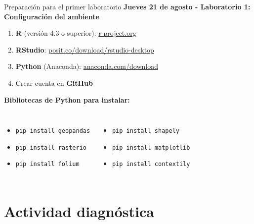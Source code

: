 \documentclass[10pt]{beamer}
\newcommand{\examplebox}[2]{
\begin{tcolorbox}[colframe=usachblue,colback=white,title=#1]
#2
\end{tcolorbox}
}
\begin{document}
\begin{frame}{Preparación para el primer laboratorio}
    \textbf{Jueves 21 de agosto - Laboratorio 1: Configuración del ambiente}
    
    \examplebox{Para instalar antes de la clase:}{
        \begin{enumerate}
            \item \textbf{R} (versión 4.3 o superior): \url{r-project.org}
            \item \textbf{RStudio}: \url{posit.co/download/rstudio-desktop}
            \item \textbf{Python} (Anaconda): \url{anaconda.com/download}
            \item Crear cuenta en \textbf{GitHub}
        \end{enumerate}
    }
    
    \textbf{Bibliotecas de Python para instalar:}
    \begin{columns}
        \begin{itemize}
            \item \texttt{pip install geopandas}
            \item \texttt{pip install rasterio}
            \item \texttt{pip install folium}
        \end{itemize}
        
        \begin{itemize}
            \item \texttt{pip install shapely}
            \item \texttt{pip install matplotlib}
            \item \texttt{pip install contextily}
        \end{itemize}
    \end{columns}
\end{frame}

\section{Actividad diagnóstica}
\end{document}
